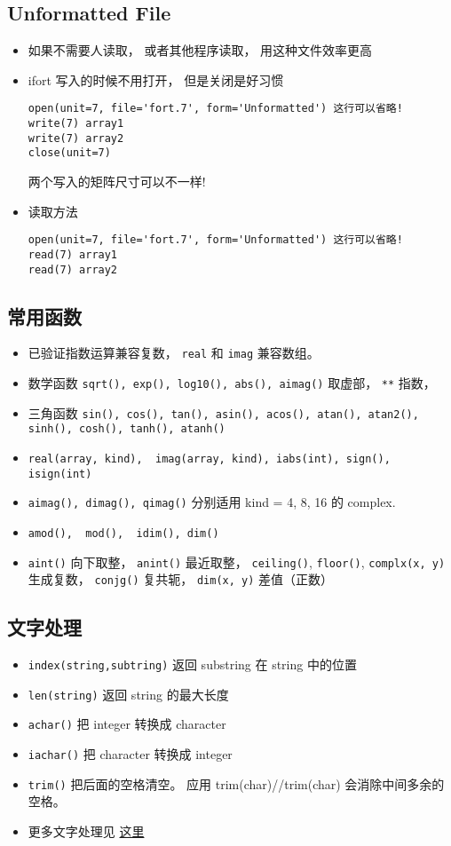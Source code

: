 \subsection{Unformatted File}
\begin{itemize}
\item 如果不需要人读取， 或者其他程序读取， 用这种文件效率更高
\item ifort 写入的时候不用打开， 但是关闭是好习惯
\begin{lstlisting}[language=none]
open(unit=7, file='fort.7', form='Unformatted') 这行可以省略!
write(7) array1
write(7) array2
close(unit=7)
\end{lstlisting}
两个写入的矩阵尺寸可以不一样!

\item 读取方法
\begin{lstlisting}[language=none]
open(unit=7, file='fort.7', form='Unformatted') 这行可以省略!
read(7) array1
read(7) array2
\end{lstlisting}
\end{itemize}

\subsection{常用函数}
\begin{itemize}
\item 已验证指数运算兼容复数， \verb`real` 和 \verb`imag` 兼容数组。
\item 数学函数 \verb`sqrt(), exp(), log10(), abs(), aimag()` 取虚部， \verb`**` 指数， 
\item 三角函数 \verb`sin(), cos(), tan(), asin(), acos(), atan(), atan2(), sinh(), cosh(), tanh(), atanh()`
\item \verb`real(array, kind),  imag(array, kind), iabs(int), sign(), isign(int)`
\item \verb`aimag(), dimag(), qimag()` 分别适用 kind = 4, 8, 16 的 complex.
\item \verb`amod(),  mod(),  idim(), dim()`
\item \verb`aint()` 向下取整， \verb`anint()` 最近取整， \verb`ceiling()`, \verb`floor()`, \verb`complx(x, y)` 生成复数， \verb`conjg()` 复共轭， \verb`dim(x, y)` 差值（正数）
\end{itemize}

\subsection{文字处理}
\begin{itemize}
\item \verb`index(string,subtring)` 返回 substring 在 string 中的位置
\item \verb`len(string)` 返回 string 的最大长度
\item \verb`achar()` 把 integer 转换成 character
\item \verb`iachar()` 把 character 转换成 integer
\item \verb`trim()` 把后面的空格清空。 应用  trim(char)//trim(char) 会消除中间多余的空格。
\item 更多文字处理见 \href{http://www.tutorialspoint.com/fortran/fortran_characters.htm}{这里}
\end{itemize}

